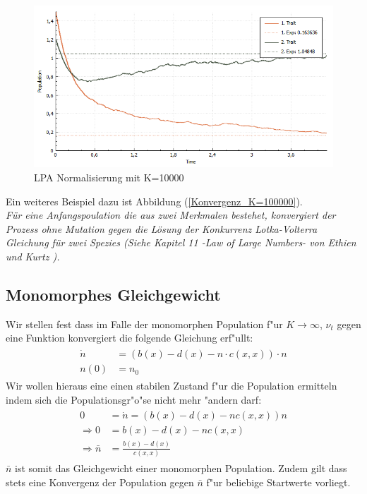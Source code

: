\documentclass[11pt, a4paper, german]{article}
\begin{document}
	\begin{figure}[H]
		\centering
		\includegraphics[width=0.7\linewidth]{./Pictures/LPANormalisierungK10000}
		\caption[LPAK100]{LPA Normalisierung mit K=10000}
		\label{LPA Normalisierung K=10000}
	\end{figure}
	Ein weiteres Beispiel dazu ist Abbildung (\ref{Konvergenz_K=100000}).\\
	\textit{Für eine Anfangspoulation die aus zwei Merkmalen bestehet, konvergiert der Prozess ohne Mutation gegen die Lösung der Konkurrenz Lotka-Volterra Gleichung für zwei Spezies (Siehe Kapitel 11 -Law of Large Numbers- von Ethien und Kurtz \cite{ethier2009markov}).}
	
	\subsection{Monomorphes Gleichgewicht}
	Wir stellen fest dass im Falle der monomorphen Population f"ur $ K \to \infty $, $ \nu_t $ gegen eine Funktion konvergiert die folgende Gleichung erf"ullt:
	\begin{align}
	\begin{split}
		\dot{n} &= (b(x) - d(x) - n \cdot c(x,x)) \cdot n \\
		n(0) &= n_0
	\end{split}
	\end{align}
	Wir wollen hieraus eine einen stabilen Zustand f"ur die Population ermitteln indem sich die Populationsgr"o"se nicht mehr "andern darf:
	\begin{align}
	\begin{split}
		0 &= \dot{n} = (b(x) - d(x) - nc(x,x))n\\
		\Rightarrow 0 &= b(x) - d(x) - nc(x,x)\\
		\Rightarrow \bar{n} &= \frac{b(x) - d(x)}{c(x,x)}
	\end{split}
	\end{align}
	$ \bar{n} $ ist somit das Gleichgewicht einer monomorphen Population. Zudem gilt dass stets eine Konvergenz der Population gegen $ \bar{n} $ f"ur beliebige Startwerte vorliegt.
	
\end{document}
